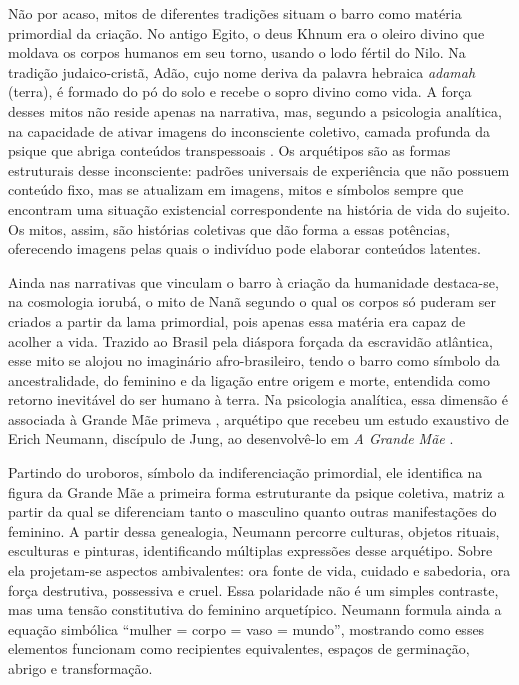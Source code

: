 Não por acaso, mitos de diferentes tradições situam o barro como matéria primordial da criação. No antigo Egito, o deus Khnum era o oleiro divino que moldava os corpos humanos em seu torno, usando o lodo fértil do Nilo. Na tradição judaico-cristã, Adão, cujo nome deriva da palavra hebraica \emph{adamah} (terra), é formado do pó do solo e recebe o sopro divino como vida. A força desses mitos não reside apenas na narrativa, mas, segundo a psicologia analítica, na capacidade de ativar imagens do inconsciente coletivo, camada profunda da psique que abriga conteúdos transpessoais \parencite{jungOsArquetiposInconsciente2007}. Os arquétipos são as formas estruturais desse inconsciente: padrões universais de experiência que não possuem conteúdo fixo, mas se atualizam em imagens, mitos e símbolos sempre que encontram uma situação existencial correspondente na história de vida do sujeito. Os mitos, assim, são histórias coletivas que dão forma a essas potências, oferecendo imagens pelas quais o indivíduo pode elaborar conteúdos latentes.

Ainda nas narrativas que vinculam o barro à criação da humanidade destaca-se, na cosmologia iorubá, o mito de Nanã segundo o qual os corpos só puderam ser criados a partir da lama primordial, pois apenas essa matéria era capaz de acolher a vida. Trazido ao Brasil pela diáspora forçada da escravidão atlântica, esse mito se alojou no imaginário afro-brasileiro, tendo o barro como símbolo da ancestralidade, do feminino e da ligação entre origem e morte, entendida como retorno inevitável do ser humano à terra. Na psicologia analítica, essa dimensão é associada à Grande Mãe primeva \parencite{zacharias2025}, arquétipo que recebeu um estudo exaustivo de Erich Neumann, discípulo de Jung, ao desenvolvê-lo em \emph{A Grande Mãe} \citeyear{neumannGreatMotherAnalysis1955}.

Partindo do uroboros, símbolo da indiferenciação primordial, ele identifica na figura da Grande Mãe a primeira forma estruturante da psique coletiva, matriz a partir da qual se diferenciam tanto o masculino quanto outras manifestações do feminino. A partir dessa genealogia, Neumann percorre culturas, objetos rituais, esculturas e pinturas, identificando múltiplas expressões desse arquétipo. Sobre ela projetam-se aspectos ambivalentes: ora fonte de vida, cuidado e sabedoria, ora força destrutiva, possessiva e cruel. Essa polaridade não é um simples contraste, mas uma tensão constitutiva do feminino arquetípico. Neumann formula ainda a equação simbólica “mulher = corpo = vaso = mundo”, mostrando como esses elementos funcionam como recipientes equivalentes, espaços de germinação, abrigo e transformação.


